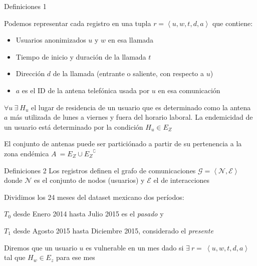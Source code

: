 \documentclass[xcolor=x11names]{beamer}
\def\calE{\mathcal{E}}
\def\calG{\mathcal{G}}
\def\calN{\mathcal{N}}
\begin{document}

\begin{frame}{Definiciones 1}

	Podemos representar cada registro en una tupla $r =\left < u, w, t, d, a \right >$ que contiene:
	\begin{itemize}
		\item Usuarios anonimizados $u$ y $w$ en esa llamada
		\item Tiempo de inicio y duración de la llamada $t$
		\item Dirección $d$ de la llamada (entrante o saliente, con respecto a $u$)
		\item $a$ es el ID de la antena telefónica usada por $u$ en esa comunicación
	\end{itemize}

	\medskip
	$\forall u \  \exists \  H_u$ el lugar de residencia de un usuario que es determinado como la antena $a$ más utilizada de lunes a viernes y fuera del horario laboral. La endemicidad de un usuario está determinado por la condición $H_u \in E_Z$

	\medskip

	El conjunto de antenas puede ser particiónado a partir de su pertenencia a la zona endémica $A \ = E_Z \cup {E_Z}^{\complement} $

\end{frame}



\begin{frame}{Definiciones 2}
	Los registros definen el grafo de comunicaciones
	$\calG = \left< \calN, \calE \right> $ donde $\calN$ es el conjunto de nodos (usuarios) y $\calE$ el de interacciones

	\medskip
	Dividimos los 24 meses del dataset mexicano dos períodos:
	\begin{enumerate*}[label={\alph*)},]
			\item $T_0$ desde Enero 2014 hasta Julio 2015 es el \textit{pasado} y
			\item $T_1$ desde Agosto 2015 hasta Diciembre 2015, considerado el \textit{presente}
	\end{enumerate*}

	\medskip
	Diremos que un usuario $u$ es vulnerable en un mes dado si $\exists \ r = \ \left < u, w, t, d, a \right > $ tal que $H_w \in E_z$ para ese mes

\end{frame}
\end{document}
